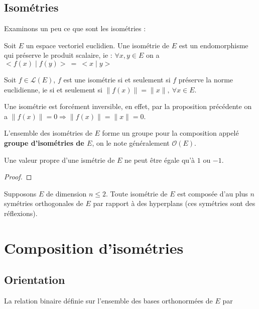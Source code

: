 \documentclass[12pt,a4paper]{article}
\newcommand{\Oo}{\mathcal{O}}
\newcommand{\Ll}{\mathcal{L}}
\begin{document}
\subsection{Isométries}
Examinons un peu ce que sont les isométries :

\begin{df}
Soit $E$ un espace vectoriel euclidien. Une isométrie de $E$ est un endomorphisme qui préserve le produit scalaire, ie : $\forall x,y \in E$ on a $<f(x)\mid f(y)>~ =~ <x\mid y>$
\end{df}

\begin{prop}
Soit $f \in \Ll(E)$, $f$ est une isométrie si et seulement si  $f$ préserve la norme euclidienne, ie si  et seulement si $\|f(x) \| = \| x \|,~ \forall x \in E$. 
\end{prop}

\begin{coro}
Une isométrie est forcément inversible, en effet, par la proposition précédente on a $\|f(x)\| = 0 \Rightarrow \|f(x)\| = \|x\| = 0$. 
\end{coro}

\begin{prop}
L'ensemble des isométries de $E$ forme un groupe pour la composition appelé \textbf{groupe d'isométries de $E$}, on le note généralement $\Oo(E)$.
\end{prop}

\begin{prop}
Une valeur propre d'une ismétrie de $E$ ne peut être égale qu'à $1$ ou $-1$.
\end{prop}

\begin{proof}

\end{proof}
\begin{theo}
Supposons $E$ de dimension $n \leq 2$. Toute isométrie de $E$ est composée d'au plus $n$ symétries orthogonales de $E$ par rapport à des hyperplans (ces symétries sont des réflexions).
\end{theo}

\section{Composition d'isométries}
\subsection{Orientation}
\begin{prop}
La relation binaire définie sur l'ensemble des bases orthonormées de $E$ par 
\end{prop}
\end{document}

